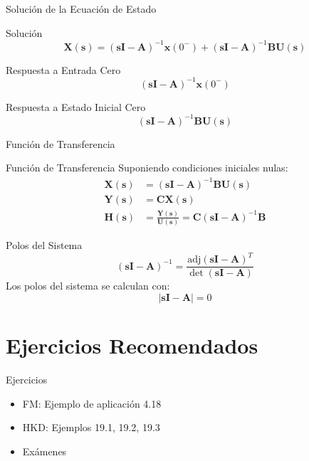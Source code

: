 \documentclass[xcolor={usenames,svgnames,dvipsnames}]{beamer}
\newcommand{\laplace}[1]{\mathbf{#1}(\mathbf{s})}
\newcommand{\slp}{\mathbf{s}}
\begin{document}
\begin{frame}[label={sec:orga0ca4f5}]{Solución de la Ecuación de Estado}
\begin{block}{Solución}
\[
  \laplace{X} = \left(\slp \mathbf{I} - \mathbf{A} \right)^{-1} \mathbf{x}(0^-) + \left(\slp \mathbf{I} - \mathbf{A} \right)^{-1} \mathbf{B}\laplace{U}
\]
\end{block}

\begin{block}{Respuesta a Entrada Cero}
\[
  \left(\slp \mathbf{I} - \mathbf{A} \right)^{-1} \mathbf{x}(0^-)
\]
\end{block}

\begin{block}{Respuesta a Estado Inicial Cero}
\[
  \left(\slp \mathbf{I} - \mathbf{A} \right)^{-1} \mathbf{B}\laplace{U}
\]
\end{block}
\end{frame}

\begin{frame}[label={sec:org7e69ebd}]{Función de Transferencia}
\begin{block}{Función de Transferencia}
Suponiendo condiciones iniciales nulas:
\begin{align*}
  \laplace{X} &= \left(\slp \mathbf{I} - \mathbf{A} \right)^{-1} \mathbf{B} \laplace{U}\\
  \laplace{Y} &= \mathbf{C} \laplace{X}\\
  \laplace{H} &= \frac{\laplace{Y}}{\laplace{U}}  = \mathbf{C} \left(\slp \mathbf{I} - \mathbf{A} \right)^{-1} \mathbf{B}
\end{align*}
\end{block}

\begin{block}{Polos del Sistema}
\[
  \left(\slp \mathbf{I} - \mathbf{A} \right)^{-1} = \frac{\text{adj}(\slp \mathbf{I} - \mathbf{A})^T}{\det(\slp \mathbf{I} - \mathbf{A})}
\]
Los polos del sistema se calculan con:
\[
|\slp \mathbf{I} - \mathbf{A}| = 0
\]
\end{block}
\end{frame}
\section{Ejercicios Recomendados}
\label{sec:orgc7186a2}

\begin{frame}[label={sec:org4ed8ce1}]{Ejercicios}
\begin{itemize}
\item FM: Ejemplo de aplicación 4.18
\item HKD: Ejemplos 19.1, 19.2, 19.3
\item Exámenes
\end{itemize}
\end{frame}
\end{document}
